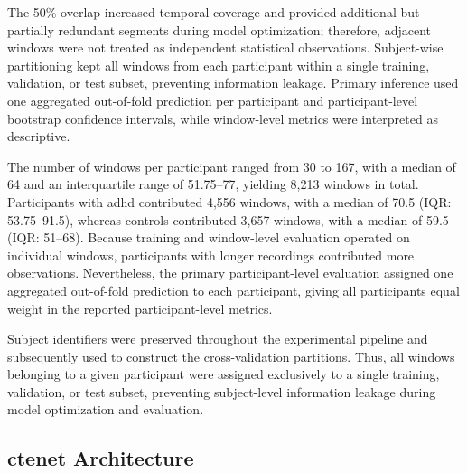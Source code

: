 {The 50\% overlap increased temporal coverage and provided additional but partially redundant segments during model optimization; therefore, adjacent windows were not treated as independent statistical observations. Subject-wise partitioning kept all windows from each participant within a single training, validation, or test subset, preventing information leakage. Primary inference used one aggregated out-of-fold prediction per participant and participant-level bootstrap confidence intervals, while window-level metrics were interpreted as descriptive.}

{The number of windows per participant ranged from 30 to 167, with a median of 64 and an interquartile range of 51.75--77, yielding 8,213 windows in total. Participants with \gls{adhd} contributed 4,556 windows, with a median of 70.5 (IQR: 53.75--91.5), whereas controls contributed 3,657 windows, with a median of 59.5 (IQR: 51--68). Because training and window-level evaluation operated on individual windows, participants with longer recordings contributed more observations. Nevertheless, the primary participant-level evaluation assigned one aggregated out-of-fold prediction to each participant, giving all participants equal weight in the reported participant-level metrics.}

Subject identifiers were preserved throughout the experimental pipeline and subsequently used to construct the cross-validation partitions. Thus, all windows belonging to a given participant were assigned exclusively to a single training, validation, or test subset, preventing subject-level information leakage during model optimization and evaluation.
\subsection{\gls{ctenet} Architecture}

